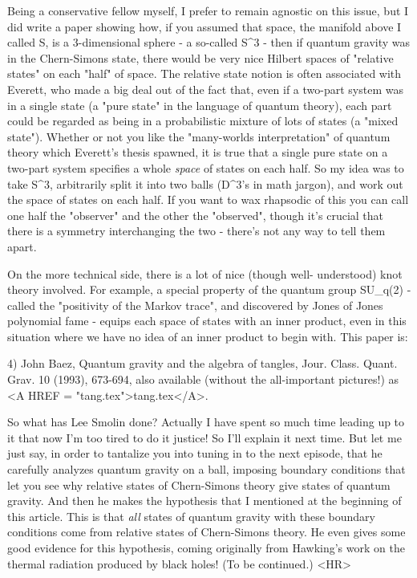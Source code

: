 Being a conservative fellow myself, I prefer to remain agnostic
on this issue, but I did write a paper showing how, if you assumed 
that space, the manifold above I called S, is a 3-dimensional sphere -
a so-called S^3 - then if quantum gravity was in the Chern-Simons
state, there would be very nice Hilbert spaces of "relative states" on
each "half" of space.  The relative state notion is often associated
with Everett, who made a big deal out of the fact that, even if
a two-part system was in a single state (a "pure state" in the language
of quantum theory), each part could be regarded as being in a probabilistic
mixture of lots of states (a "mixed state").  Whether or not you like
the "many-worlds interpretation" of quantum theory which Everett's thesis 
spawned, it is true that a single pure state on a two-part system specifies
a whole \emph{space} of states on each half.  So my idea was to take S^3,
arbitrarily split it into two balls (D^3's in math jargon), and work out
the space of states on each half.  If you want to wax rhapsodic of this
you can call one half the "observer" and the other the "observed", though
it's crucial that there is a symmetry interchanging the two - there's
not any way to tell them apart.  

On the more technical side, there is a lot of nice (though well-
understood) knot theory involved.  For example, a special property of
the quantum group SU_q(2) - called the "positivity of the Markov trace", 
and discovered by Jones of Jones polynomial fame - equips each 
space of states with an inner product, even in this situation where 
we have no idea of an inner product to begin with.  This paper is:

4) John Baez, Quantum gravity and the algebra of tangles, Jour. Class.
Quant. Grav. 10 (1993), 673-694, also available (without 
the all-important pictures!) as <A HREF = "tang.tex">tang.tex</A>.

So what has Lee Smolin done?  Actually I have spent so much time
leading up to it that now I'm too tired to do it justice!  So I'll explain
it next time.  But let me just say, in order to tantalize you into tuning
in to the next episode, that he carefully analyzes quantum gravity on
a ball, imposing boundary conditions that let you see why relative
states of Chern-Simons theory give states of quantum gravity.  And
then he makes the hypothesis that I mentioned at the beginning
of this article.  This is that \emph{all} states of quantum gravity
with these boundary conditions come from relative states of
Chern-Simons theory.  He even gives some good evidence for this
hypothesis, coming originally from Hawking's work on the thermal
radiation produced by black holes!  (To be continued.)
<HR>



